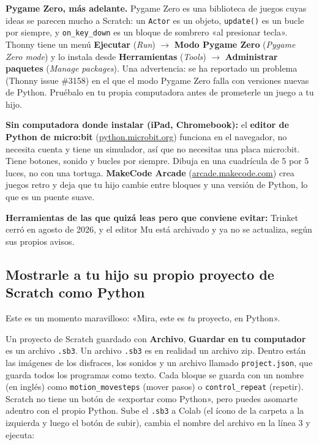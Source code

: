 \textbf{Pygame Zero, más adelante.} Pygame Zero es una biblioteca de juegos cuyas ideas se parecen mucho a Scratch: un \texttt{Actor} es un objeto, \texttt{update()} es un bucle por siempre, y \texttt{on\_key\_down} es un bloque de sombrero «al presionar tecla». Thonny tiene un menú \textbf{Ejecutar} (\textit{Run}) $\rightarrow$ \textbf{Modo Pygame Zero} (\textit{Pygame Zero mode}) y lo instala desde \textbf{Herramientas} (\textit{Tools}) $\rightarrow$ \textbf{Administrar paquetes} (\textit{Manage packages}). Una advertencia: se ha reportado un problema (Thonny issue \#3158) en el que el modo Pygame Zero falla con versiones nuevas de Python. Pruébalo en tu propia computadora antes de prometerle un juego a tu hijo.

\textbf{Sin computadora donde instalar (iPad, Chromebook):} el \textbf{editor de Python de micro:bit} (\url{python.microbit.org}) funciona en el navegador, no necesita cuenta y tiene un simulador, así que no necesitas una placa micro:bit. Tiene botones, sonido y bucles por siempre. Dibuja en una cuadrícula de 5 por 5 luces, no con una tortuga. \textbf{MakeCode Arcade} (\url{arcade.makecode.com}) crea juegos retro y deja que tu hijo cambie entre bloques y una versión de Python, lo que es un puente suave.

\textbf{Herramientas de las que quizá leas pero que conviene evitar:} Trinket cerró en agosto de 2026, y el editor Mu está archivado y ya no se actualiza, según sus propios avisos.

\subsection*{Mostrarle a tu hijo su propio proyecto de Scratch como Python}

Este es un momento maravilloso: «Mira, este es \emph{tu} proyecto, en Python».

Un proyecto de Scratch guardado con \textbf{Archivo}, \textbf{Guardar en tu computador} es un archivo \texttt{.sb3}. Un archivo \texttt{.sb3} es en realidad un archivo zip. Dentro están las imágenes de los disfraces, los sonidos y un archivo llamado \texttt{project.json}, que guarda todos los programas como texto. Cada bloque se guarda con un nombre (en inglés) como \texttt{motion\_movesteps} (mover pasos) o \texttt{control\_repeat} (repetir). Scratch no tiene un botón de «exportar como Python», pero puedes asomarte adentro con el propio Python. Sube el \texttt{.sb3} a Colab (el ícono de la carpeta a la izquierda y luego el botón de subir), cambia el nombre del archivo en la línea 3 y ejecuta:

